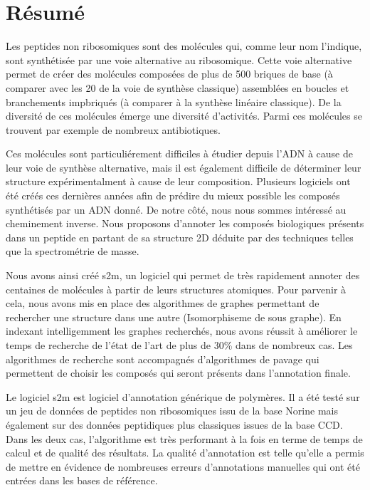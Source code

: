 \documentclass[12pt]{LHSV_thesis}
\begin{document}
\section*{\Huge Résumé}
%

Les peptides non ribosomiques sont des molécules qui, comme leur nom l'indique, sont synthétisée par une voie alternative au ribosomique.
Cette voie alternative permet de créer des molécules composées de plus de 500 briques de base (à comparer avec les 20 de la voie de synthèse classique) assemblées en boucles et branchements impbriqués (à comparer à la synthèse linéaire classique).
De la diversité de ces molécules émerge une diversité d'activités.
Parmi ces molécules se trouvent par exemple de nombreux antibiotiques.

Ces molécules sont particuliérement difficiles à étudier depuis l'ADN à cause de leur voie de synthèse alternative, mais il est également difficile de déterminer leur structure expérimentalment à cause de leur composition.
Plusieurs logiciels ont été créés ces dernières années afin de prédire du mieux possible les composés synthétisés par un ADN donné.
De notre côté, nous nous sommes intéressé au cheminement inverse.
Nous proposons d'annoter les composés biologiques présents dans un peptide en partant de sa structure 2D déduite par des techniques telles que la spectrométrie de masse.

Nous avons ainsi créé s2m, un logiciel qui permet de très rapidement annoter des centaines de molécules à partir de leurs structures atomiques.
Pour parvenir à cela, nous avons mis en place des algorithmes de graphes permettant de rechercher une structure dans une autre (Isomorphiseme de sous graphe).
En indexant intelligemment les graphes recherchés, nous avons réussit à améliorer le temps de recherche de l'état de l'art de plus de 30\% dans de nombreux cas.
Les algorithmes de recherche sont accompagnés d'algorithmes de pavage qui permettent de choisir les composés qui seront présents dans l'annotation finale.
 
Le logiciel s2m est logiciel d'annotation générique de polymères.
Il a été testé sur un jeu de données de peptides non ribosomiques issu de la base Norine mais également sur des données peptidiques plus classiques issues de la base CCD.
Dans les deux cas, l'algorithme est très performant à la fois en terme de temps de calcul et de qualité des résultats.
La qualité d'annotation est telle qu'elle a permis de mettre en évidence de nombreuses erreurs d'annotations manuelles qui ont été entrées dans les bases de référence.
\end{document}
